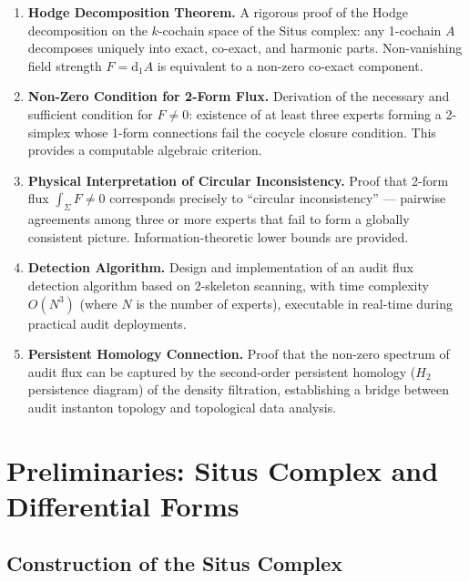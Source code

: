 \documentclass[12pt,a4paper]{article}
\theoremstyle{plain}
\theoremstyle{definition}
\theoremstyle{remark}
\newcommand{\dd}{\mathrm{d}}
\begin{document}
\begin{enumerate}[label=\textbf{C\arabic*}, leftmargin=*]
    \item \textbf{Hodge Decomposition Theorem.} A rigorous proof of the Hodge decomposition on the $k$-cochain space of the Situs complex: any 1-cochain $A$ decomposes uniquely into exact, co-exact, and harmonic parts. Non-vanishing field strength $F = \dd_1 A$ is equivalent to a non-zero co-exact component.
    \item \textbf{Non-Zero Condition for 2-Form Flux.} Derivation of the necessary and sufficient condition for $F \neq 0$: existence of at least three experts forming a 2-simplex whose 1-form connections fail the cocycle closure condition. This provides a computable algebraic criterion.
    \item \textbf{Physical Interpretation of Circular Inconsistency.} Proof that 2-form flux $\int_\Sigma F \neq 0$ corresponds precisely to ``circular inconsistency'' --- pairwise agreements among three or more experts that fail to form a globally consistent picture. Information-theoretic lower bounds are provided.
    \item \textbf{Detection Algorithm.} Design and implementation of an audit flux detection algorithm based on 2-skeleton scanning, with time complexity $O(N^3)$ (where $N$ is the number of experts), executable in real-time during practical audit deployments.
    \item \textbf{Persistent Homology Connection.} Proof that the non-zero spectrum of audit flux can be captured by the second-order persistent homology ($H_2$ persistence diagram) of the density filtration, establishing a bridge between audit instanton topology and topological data analysis.
\end{enumerate}

\section{Preliminaries: Situs Complex and Differential Forms}
\label{sec:prelim}

\subsection{Construction of the Situs Complex}
\end{document}
